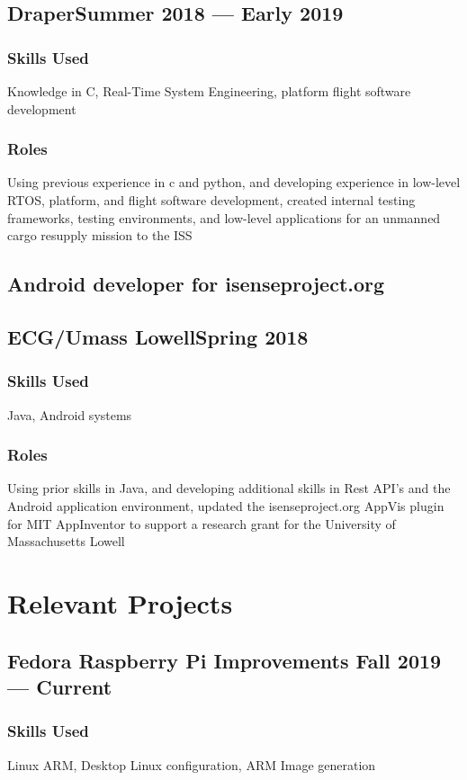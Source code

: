 \documentclass[11pt]{article}
\begin{document}
\subsection{Draper\dotfill Summer 2018 --- Early 2019}
\subsubsection{Skills Used} Knowledge in C, Real-Time System Engineering, platform flight software development
\subsubsection{Roles}
Using previous experience in c and python, and developing experience in low-level
RTOS, platform, and flight software development,
created internal testing frameworks, testing environments, and 
low-level applications for an unmanned cargo resupply mission
to the ISS

\subsection{Android developer for isenseproject.org}
\subsection{ECG/Umass Lowell\dotfill Spring 2018}
\subsubsection{Skills Used} Java, Android systems
\subsubsection{Roles}
Using prior skills in Java, and developing additional skills in
Rest API's and the Android application environment, 
updated the isenseproject.org AppVis plugin for MIT AppInventor
to support a research grant for the University of Massachusetts Lowell

\section{Relevant Projects}

\subsection{Fedora Raspberry Pi Improvements \dotfill Fall 2019 --- Current }

\subsubsection{Skills Used} Linux ARM, Desktop Linux configuration, ARM Image generation
\end{document}
